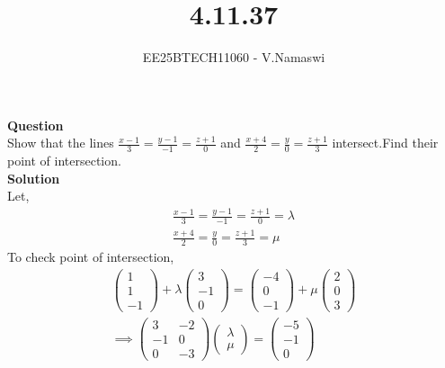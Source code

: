 \documentclass[journal]{IEEEtran}
\begin{document}

\vspace{3cm}

\title{4.11.37}
\author{EE25BTECH11060 - V.Namaswi}
{\let\newpage\relax\maketitle}
\renewcommand{\thefigure}{\theenumi}
\renewcommand{\thetable}{\theenumi}
\setlength{\intextsep}{10pt} %
\textbf{Question}\\Show that the lines $\frac{x-1}{3}=\frac{y-1}{-1}=\frac{z+1}{0}$  and $\frac{x+4}{2}=\frac{y}{0}=\frac{z+1}{3}$ intersect.Find their point of intersection.\\
\textbf{Solution}\\
Let,
\begin{align}
\frac{x-1}{3}=\frac{y-1}{-1}=\frac{z+1}{0}=\lambda\\
\frac{x+4}{2}=\frac{y}{0}=\frac{z+1}{3}=\mu
\end{align}
 To check point of intersection,
 \begin{align}
     \begin{pmatrix}
         1 \\ 1 \\ -1 
     \end{pmatrix}+\lambda \begin{pmatrix}
         3 \\ -1 \\ 0
     \end{pmatrix}=\begin{pmatrix}
         -4 \\ 0 \\ -1 
     \end{pmatrix}+ \mu \begin{pmatrix}
         2 \\ 0 \\ 3
     \end{pmatrix}\\
     \implies \begin{pmatrix}
         3 & -2 \\ -1 & 0 \\ 0 & -3 
     \end{pmatrix}\begin{pmatrix}
         \lambda \\ \mu
     \end{pmatrix}=\begin{pmatrix}
         -5 \\ -1 \\ 0
     \end{pmatrix}\\
 \end{align}
\end{document}
